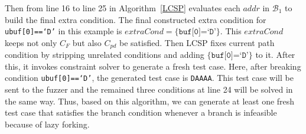 Then from line 16 to line 25 in Algorithm~\ref{LCSP} evaluates each $addr$ in $\mathcal{B}_1$ to build the final extra condition. The final constructed extra
condition for \texttt{ubuf[0]==`D'} in this example is $extraCond=\{\texttt{buf[0]=`D'}\}$.
This $extraCond$ keeps not only $C_F$ but also $C_{pd}$ be satisfied.
Then LCSP fixes current path condition by stripping unrelated conditions and adding
$\{\texttt{buf[0]=`D'}\}$ to it. After this, it invokes constraint solver to 
generate a fresh test case. Here, after breaking condition \texttt{ubuf[0]==`D'}, the 
generated test case is \texttt{DAAAA}. This test case will be sent to the fuzzer and the
remained three conditions at line 24 will be solved in the same way. Thus, based on this algorithm, we can generate at least one fresh test case 
that satisfies the branch condition whenever a branch is infeasible 
because of lazy forking. 

